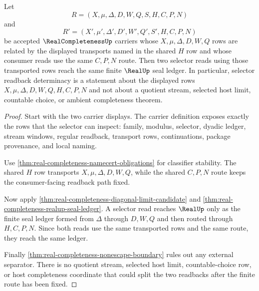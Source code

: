 \begin{theorem}
\label{thm:real-completeness-selector-readback-determinacy}
Let
$$
R=(X,\mu,\Delta,D,W,Q,S,H,C,P,N)
$$
and
$$
R'=(X',\mu',\Delta',D',W',Q',S',H,C,P,N)
$$
be accepted $\RealCompletenessUp$ carriers whose $X,\mu,\Delta,D,W,Q$ rows are related by the displayed transports named in the shared $H$ row and whose consumer reads use the same $C,P,N$ route. Then two selector reads using those transported rows reach the same finite $\RealUp$ seal ledger. In particular, selector readback determinacy is a statement about the displayed rows $X,\mu,\Delta,D,W,Q,H,C,P,N$ and not about a quotient stream, selected host limit, countable choice, or ambient completeness theorem.
\end{theorem}
\begin{proof}
Start with the two carrier displays. The carrier definition exposes exactly the rows that the selector can inspect: family, modulus, selector, dyadic ledger, stream windows, regular readback, transport rows, continuations, package provenance, and local naming.

Use \autoref{thm:real-completeness-namecert-obligations} for classifier stability. The shared $H$ row transports $X,\mu,\Delta,D,W,Q$, while the shared $C,P,N$ route keeps the consumer-facing readback path fixed.

Now apply \autoref{thm:real-completeness-diagonal-limit-candidate} and \autoref{thm:real-completeness-realup-seal-ledger}. A selector read reaches $\RealUp$ only as the finite seal ledger formed from $\Delta$ through $D,W,Q$ and then routed through $H,C,P,N$. Since both reads use the same transported rows and the same route, they reach the same ledger.

Finally \autoref{thm:real-completeness-nonescape-boundary} rules out any external separator. There is no quotient stream, selected host limit, countable-choice row, or host completeness coordinate that could split the two readbacks after the finite route has been fixed.
\end{proof}

